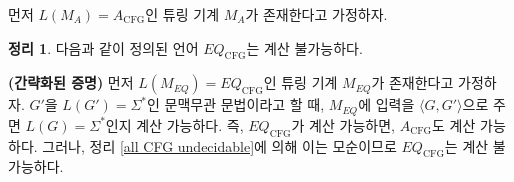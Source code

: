 \documentclass[b5paper, 10pt]{book}
\theoremstyle{definition}
\newtheorem{thm}[defn]{정리}
\newenvironment{pf*}{\pushQED{\qed}\pf}{\popQED\endpf}
\begin{document}
\begin{pf*}
    먼저 $L(M_A) = A_\text{CFG}$인 튜링 기계 $M_A$가 존재한다고 가정하자. 
\end{pf*}
\begin{thm}
    다음과 같이 정의된 언어 $EQ_\text{CFG}$는 계산 불가능하다.
\end{thm}
\begin{pf*}
    \textbf{(간략화된 증명)}
    먼저 $L(M_{EQ}) = EQ_\text{CFG}$인 튜링 기계 $M_{EQ}$가 존재한다고 가정하자. 
    $G'$을 $L(G') = \Sigma^*$인 문맥무관 문법이라고 할 때,
    $M_{EQ}$에 입력을 $\langle G, G' \rangle$으로 주면 $L(G) = \Sigma^*$인지 계산 가능하다.
    즉, $EQ_\text{CFG}$가 계산 가능하면, $A_\text{CFG}$도 계산 가능하다. 그러나, 정리 \ref{all CFG undecidable}에 의해
     이는 모순이므로 
    $EQ_\text{CFG}$는 계산 불가능하다.
\end{pf*}
\end{document}
